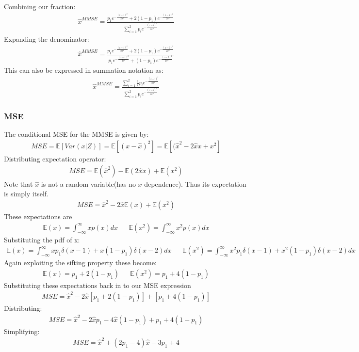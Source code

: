 \documentclass{article}
\begin{document}
Combining our fraction:
\begin{align*}
\hat{x}^{MMSE} =  \frac{ p_1 e^{-\tfrac{(z-1)^2}{2\sigma^2}}+ 2(1-p_1) e^{-\tfrac{(z-2)^2}{2\sigma^2}} }{ \sum_{i=1}^{2} p_i e^{-\tfrac{(z-i)^2}{2\sigma^2}} }
\end{align*}
Expanding the denominator:
\begin{align*}
\boxed{ \hat{x}^{MMSE} =  \frac{ p_1 e^{-\tfrac{(z-1)^2}{2\sigma^2}}+ 2(1-p_1) e^{-\tfrac{(z-2)^2}{2\sigma^2}} }{ p_1 e^{-\tfrac{(z-1)^2}{2\sigma^2}}+ (1-p_1) e^{-\tfrac{(z-2)^2}{2\sigma^2}} } }
\end{align*}
This can also be expressed in summation notation as:
\begin{align*}
\hat{x}^{MMSE} =  \frac{ \sum_{i=1}^{2} \tfrac{1}{i} p_i e^{-\tfrac{(z-i)^2}{2\sigma^2}}  }{ \sum_{i=1}^{2} p_i e^{-\tfrac{(z-i)^2}{2\sigma^2}} }
\end{align*}
\subsubsection*{MSE}
The conditional MSE for the MMSE is given by:
\begin{align*}
MSE = \mathbb{E}[Var(x|Z)] = \mathbb{E}[ (x-\hat{x})^2 ] = \mathbb{E}[ (\hat{x}^{2} - 2\hat{x} x + x^2 ]
\end{align*}
Distributing expectation operator:
\begin{align*}
MSE = \mathbb{E}(\hat{x}^{2}) - \mathbb{E} (2\hat{x} x) + \mathbb{E}(x^2)
\end{align*}
Note that $\hat{x}$ is not a random variable(has no $x$ dependence). Thus its expectation is simply itself.
\begin{align*}
MSE = \hat{x}^{2} - 2\hat{x}\mathbb{E}(x) + \mathbb{E}(x^2)
\end{align*}
These expectations are
\begin{align*}
\mathbb{E}(x) = \int_{-\infty}^{\infty} x p(x) dx && \mathbb{E}(x^2) = \int_{-\infty}^{\infty} x^2 p(x) dx
\end{align*}
Substituting the pdf of x:
\begin{align*}
\mathbb{E}(x) = \int_{-\infty}^{\infty} x p_1 \delta(x-1) + x(1-p_1) \delta(x-2) dx && \mathbb{E}(x^2) = \int_{-\infty}^{\infty} x^2 p_1 \delta(x-1) + x^2(1-p_1) \delta(x-2) dx
\end{align*}
Again exploiting the sifting property these become:
\begin{align*}
\mathbb{E}(x) = p_1 + 2(1-p_1) && \mathbb{E}(x^2) = p_1 + 4(1-p_1)
\end{align*}
Substituting these expectations back in to our MSE expression
\begin{align*}
MSE = \hat{x}^{2} - 2\hat{x}[p_1 + 2(1-p_1)] + [p_1 + 4(1-p_1)]
\end{align*}
Distributing:
\begin{align*}
MSE = \hat{x}^{2} - 2\hat{x}p_1 - 4\hat{x}(1-p_1) + p_1 + 4(1-p_1)
\end{align*}
Simplifying:
\begin{align*}
\boxed{ MSE = \hat{x}^{2} + (2p_1-4)\hat{x} -3p_1+4 }
\end{align*}
\end{document}
